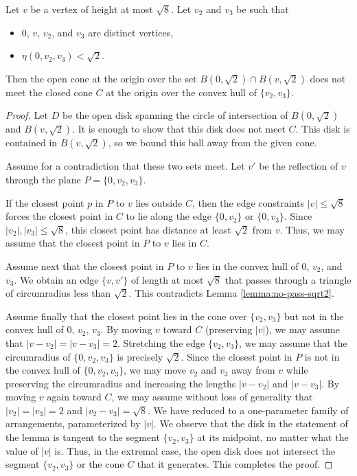 \begin{lemma}\label{lemma:sqrt2-cone-avoidance}
    Let $v$ be a vertex of height at most $\sqrt8$.  Let $v_2$ and
    $v_3$ be such that
    \begin{itemize}
        \item $0$, $v$, $v_2$, and $v_3$ are distinct vertices,
        \item $\eta(0,v_2,v_3)<\sqrt2$.
    \end{itemize}
    Then the open cone at the origin over the set $B(0,\sqrt2)\cap
     B(v,\sqrt2)$ does not meet the closed cone $C$ at the origin over
     the convex hull of $\{v_2,v_3\}$.
\end{lemma}

\begin{proof}
Let $D$ be the open disk spanning the circle of intersection of
$B(0,\sqrt2)$ and $B(v,\sqrt2)$.  It is enough to show that this
disk does not meet $C$.  This disk is contained in $B(v,\sqrt2)$,
so we bound this ball away from the given cone.

Assume for a contradiction that these two sets meet.  Let $v'$ be
the reflection of $v$ through the plane $P = \{0,v_2,v_3\}$.

If the closest point $p$ in $P$ to $v$ lies outside $C$, then the
edge constraints $|v|\le\sqrt8$ forces the closest point in $C$ to
lie along the edge $\{0,v_2\}$ or $\{0,v_3\}$.  Since
$|v_2|,|v_3|\le\sqrt8$, this closest point has distance at least
$\sqrt2$ from $v$. Thus, we may assume that the closest point in
$P$ to $v$ lies in $C$.

Assume next that the closest point in $P$ to $v$ lies in the
convex hull of $0$, $v_2$, and $v_3$.  We obtain an edge
$\{v,v'\}$ of length at most $\sqrt8$ that passes through a
triangle of circumradius less than $\sqrt2$. This contradicts
Lemma \ref{lemma:no-pass-sqrt2}.

Assume finally that the closest point lies in the cone over
$\{v_2,v_3\}$ but not in the convex hull of $0$, $v_2$, $v_3$. By
moving $v$ toward $C$ (preserving $|v|$), we may assume that
$|v-v_2|=|v-v_3|=2$.  Stretching the edge $\{v_2,v_3\}$, we may
assume that the circumradius of $\{0,v_2,v_3\}$ is precisely
$\sqrt2$.  Since the closest point in $P$ is not in the convex
hull of $\{0,v_2,v_3\}$, we may move $v_2$ and $v_3$ away from $v$
while preserving the circumradius and increasing the lengths
$|v-v_2|$ and $|v-v_3|$.  By moving $v$ again toward $C$, we may
assume without loss of generality that $|v_2|=|v_3|=2$ and
$|v_2-v_3|=\sqrt8$. We have reduced to a one-parameter family of
arrangements, parameterized by $|v|$. We observe that the disk in
the statement of the lemma is tangent to the segment $\{v_2,v_3\}$
at its midpoint, no matter what the value of $|v|$ is.  Thus, in
the extremal case, the open disk does not intersect the segment
$\{v_2,v_3\}$ or the cone $C$ that it generates.  This completes
the proof.
\end{proof}

